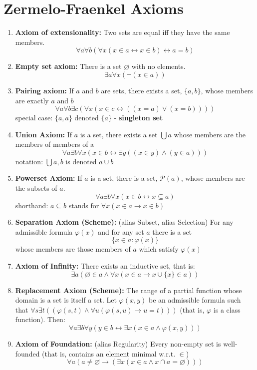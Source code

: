 \documentclass{article}
\begin{document}
\section*{Zermelo-Fraenkel Axioms}

\begin{enumerate}

\item \textbf{Axiom of extensionality:} Two sets are equal iff they have the same members.
\[
\forall a \forall b (\forall x(x \in a \leftrightarrow x \in b) \leftrightarrow a = b)
\]

\item \textbf{Empty set axiom:} There is a set $\varnothing$ with no elements.
\[
\exists a \forall x (\neg(x \in a))
\]

\item \textbf{Pairing axiom:} If $a$ and $b$ are sets, there exists a set, $\{a,b\}$,
whose members are exactly $a$ and $b$
\[
\forall a \forall b \exists c (\forall x(x \in c \leftrightarrow ((x=a) \vee (x=b))))
\]
special case: $\{a,a\}$ denoted $\{a\}$ - \textbf{singleton set}

\item \textbf{Union Axiom:} If $a$ is a set, there exists a set $\bigcup a$ whose members
are the members of members of a 
\[
\forall a \exists b \forall x (x \in b \leftrightarrow \exists y ((x \in y) \wedge
(y \in a)))
\]
notation: $\bigcup {a,b}$ is denoted $a \cup b$

\item \textbf{Powerset Axiom:} If $a$ is a set, there is a set, $\mathcal{P}(a)$, whose
members are the subsets of $a$.
\[
\forall a \exists b \forall x (x \in b \leftrightarrow x \subseteq a)
\]
shorthand: $a \subseteq b$ stands for $\forall x (x \in a \rightarrow x \in b)$

\item \textbf{Separation Axiom (Scheme):} (alias Subset, alias Selection) For any
admissible formula $\varphi(x)$ and for any set $a$ there is a set
\[
\{x \in a : \varphi (x)\}
\]
whose members are those members of $a$ which satisfy $\varphi (x)$

\item \textbf{Axiom of Infinity:} There exists an inductive set, that is:
\[
\exists a (\varnothing \in a \wedge \forall x (x \in a \rightarrow x \cup \{x\} \in a))
\]

\item \textbf{Replacement Axiom (Scheme):} The range of a partial function whose domain
is a set is itself a set. Let $\varphi (x,y)$ be an admissible formula such that
$\forall s \exists t((\varphi (s,t) \wedge \forall u (\varphi (s,u) \rightarrow u = t)))$
(that is, $\varphi$ is a class function). Then:
\[
\forall a \exists b \forall y (y \in b \leftrightarrow \exists x (x \in a \wedge \varphi (x,y)))
\]

\item \textbf{Axiom of Foundation:} (alias Regularity) Every non-empty set is well-founded
(that is, contains an element minimal w.r.t. $\in$)
\[
\forall a (a \neq \varnothing \rightarrow (\exists x (x \in a \wedge x \cap a = \varnothing)))
\]

\end{enumerate}
\end{document}
